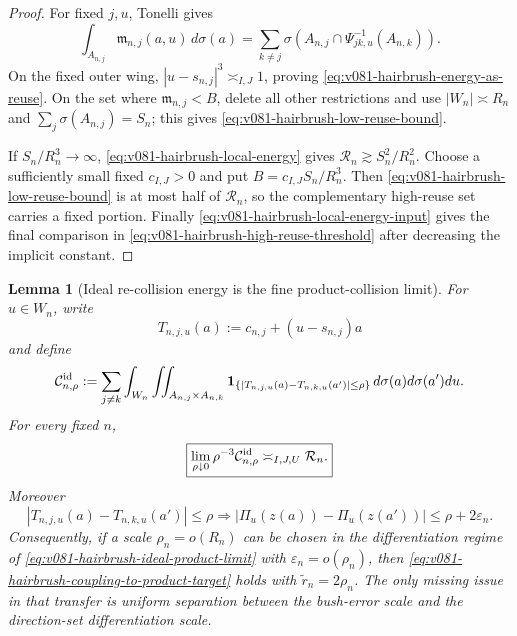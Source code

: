 \documentclass[10pt]{article}
\newtheorem{lemma}[theorem]{Lemma}
\begin{document}
\begin{proof}
For fixed \(j,u\), Tonelli gives
\[
\int_{A_{n,j}}\mathfrak m_{n,j}(a,u)\,d\sigma(a)
=
\sum_{k\ne j}
\sigma\!\left(A_{n,j}\cap\Psi_{jk,u}^{-1}(A_{n,k})\right).
\]
On the fixed outer wing, \(|u-s_{n,j}|^3\asymp_{I,J}1\), proving
\eqref{eq:v081-hairbrush-energy-as-reuse}.  On the set where
\(\mathfrak m_{n,j}<B\), delete all other restrictions and use
\(|W_n|\asymp R_n\) and \(\sum_j\sigma(A_{n,j})=S_n\); this gives
\eqref{eq:v081-hairbrush-low-reuse-bound}.

If \(S_n/R_n^3\to\infty\),
\eqref{eq:v081-hairbrush-local-energy} gives
\(\mathcal R_n\gtrsim S_n^2/R_n^2\).  Choose a sufficiently small fixed
\(c_{I,J}>0\) and put \(B=c_{I,J}S_n/R_n^3\).  Then
\eqref{eq:v081-hairbrush-low-reuse-bound} is at most half of \(\mathcal R_n\), so the complementary
high-reuse set carries a fixed portion.  Finally
\eqref{eq:v081-hairbrush-local-energy-input} gives the final comparison in
\eqref{eq:v081-hairbrush-high-reuse-threshold} after decreasing the implicit constant.
\end{proof}

\begin{lemma}[Ideal re-collision energy is the fine product-collision limit]
\label{lem:v081-hairbrush-ideal-product-limit}
For \(u\in W_n\), write
\[
T_{n,j,u}(a):=c_{n,j}+(u-s_{n,j})a
\]
and define
\[
\mathcal C^{\rm id}_{n,\rho}
:=
\sum_{j\ne k}\int_{W_n}
\iint_{A_{n,j}\times A_{n,k}}
\mathbf 1_{\{|T_{n,j,u}(a)-T_{n,k,u}(a')|\le\rho\}}
\,d\sigma(a)d\sigma(a')du.
\]
For every fixed \(n\),
\begin{equation}
\label{eq:v081-hairbrush-ideal-product-limit}
\boxed{
\lim_{\rho\downarrow0}
\rho^{-3}\mathcal C^{\rm id}_{n,\rho}
\asymp_{I,J,U}
\mathcal R_n.
}
\end{equation}
Moreover
\begin{equation}
\label{eq:v081-hairbrush-actual-ideal-inclusion}
\boxed{
|T_{n,j,u}(a)-T_{n,k,u}(a')|\le\rho
\Longrightarrow
|\Pi_u(z(a))-\Pi_u(z(a'))|
\le\rho+2\varepsilon_n.
}
\end{equation}
Consequently, if a scale \(\rho_n=o(R_n)\) can be chosen in the differentiation regime of
\eqref{eq:v081-hairbrush-ideal-product-limit} with \(\varepsilon_n=o(\rho_n)\), then
\eqref{eq:v081-hairbrush-coupling-to-product-target} holds with
\(\widetilde r_n=2\rho_n\).  The only missing issue in that transfer is uniform separation between
the bush-error scale and the direction-set differentiation scale.
\end{lemma}
\end{document}
